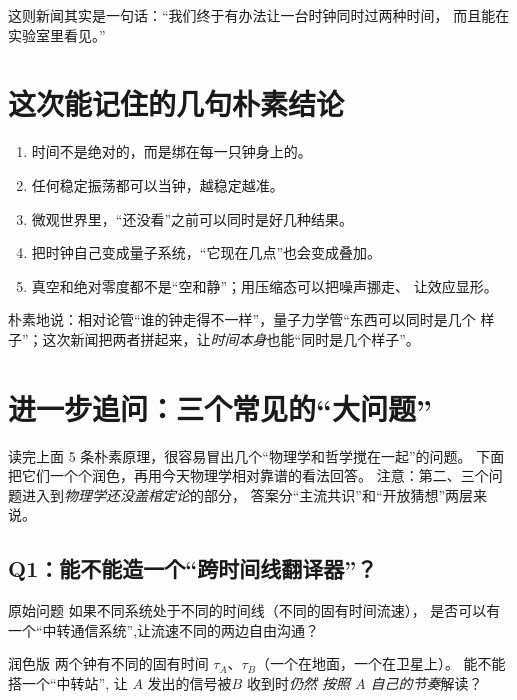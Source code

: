 \documentclass[11pt,a4paper]{ctexart}
\begin{document}
\begin{keypointblock}
这则新闻其实是一句话：``我们终于有办法让一台时钟同时过两种时间，
而且能在实验室里看见。''
\end{keypointblock}

\section{这次能记住的几句朴素结论}

\begin{enumerate}[label=\textbf{\arabic*.}]
  \item 时间不是绝对的，而是绑在每一只钟身上的。
  \item 任何稳定振荡都可以当钟，越稳定越准。
  \item 微观世界里，``还没看''之前可以同时是好几种结果。
  \item 把时钟自己变成量子系统，``它现在几点''也会变成叠加。
  \item 真空和绝对零度都不是``空和静''；用压缩态可以把噪声挪走、
        让效应显形。
\end{enumerate}

\begin{keypointblock}
朴素地说：相对论管``谁的钟走得不一样''，量子力学管``东西可以同时是几个
样子''；这次新闻把两者拼起来，让\emph{时间本身}也能``同时是几个样子''。
\end{keypointblock}

\section{进一步追问：三个常见的``大问题''}

读完上面 5 条朴素原理，很容易冒出几个``物理学和哲学搅在一起''的问题。
下面把它们一个个润色，再用今天物理学相对靠谱的看法回答。
注意：第二、三个问题进入到\emph{物理学还没盖棺定论}的部分，
答案分``主流共识''和``开放猜想''两层来说。

\subsection{Q1：能不能造一个``跨时间线翻译器''？}

\begin{questionblock}{原始问题}
如果不同系统处于不同的时间线（不同的固有时间流速），
是否可以有一个``中转通信系统'',让流速不同的两边自由沟通？
\end{questionblock}

\begin{questionblock}{润色版}
两个钟有不同的固有时间 $\tau_A$、$\tau_B$（一个在地面，一个在卫星上）。
能不能搭一个``中转站'', 让 $A$ 发出的信号被$B$ 收到时\emph{仍然
按照 $A$ 自己的节奏}解读？
\end{questionblock}
\end{document}

